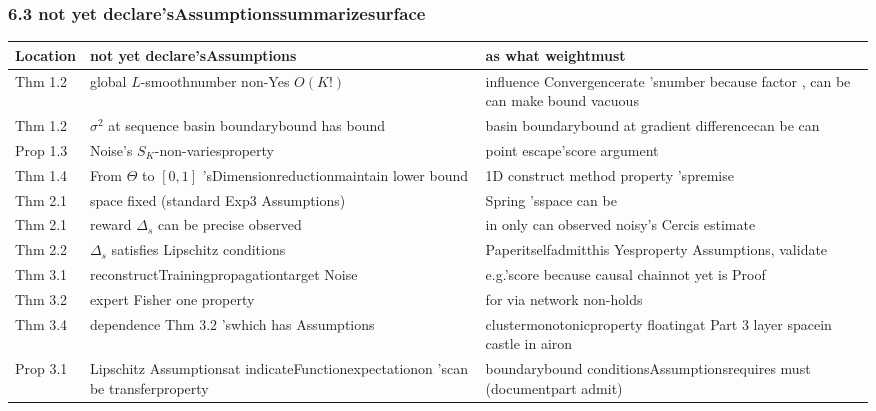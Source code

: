 \documentclass[
  12pt,
]{article}
\begin{document}
\subsubsection{6.3
not yet declare'sAssumptionssummarizesurface}\label{ux672aux58f0ux660eux7684ux5047ux8bbeux6c47ux603bux8868}

\begin{longtable}[]{@{}
  >{\raggedright\arraybackslash}p{}
  >{\raggedright\arraybackslash}p{}
  >{\raggedright\arraybackslash}p{}@{}}
\toprule\noalign{}
\begin{minipage}[b]{\linewidth}\raggedright
Location
\end{minipage} & \begin{minipage}[b]{\linewidth}\raggedright
not yet declare'sAssumptions
\end{minipage} & \begin{minipage}[b]{\linewidth}\raggedright
as what weightmust 
\end{minipage} \\
\midrule\noalign{}
\endhead
\bottomrule\noalign{}
\endlastfoot
Thm 1.2 & global  \(L\)-smoothnumber non-Yes \(O(K!)\) &
influence Convergencerate 'snumber because factor , can be can make bound  vacuous \\
Thm 1.2 & \(\sigma^2\) at sequence basin boundarybound has bound  &
basin boundarybound at gradient differencecan be can  \\
Prop 1.3 & Noise's \(S_K\)-non-variesproperty  & point escape'score argument \\
Thm 1.4 & From \(\Theta\) to  \([0,1]\) 'sDimensionreductionmaintain lower bound & 1D
construct method property 'spremise \\
Thm 2.1 & space fixed (standard  Exp3 Assumptions) & Spring 'sspace can be  \\
Thm 2.1 & reward \(\Delta_s\) can be precise observed & in only can observed noisy's Cercis
estimate \\
Thm 2.2 & \(\Delta_s\) satisfies  Lipschitz conditions &
Paperitselfadmitthis Yesproperty Assumptions, validate  \\
Thm 3.1 & reconstructTrainingpropagationtarget Noise & e.g.'score because causal chainnot yet is Proof \\
Thm 3.2 & expert  Fisher one property  & for via network non-holds \\
Thm 3.4 & dependence Thm 3.2 'swhich has Assumptions & clustermonotonicproperty floatingat Part 3 layer spacein castle in airon  \\
Prop 3.1 & Lipschitz Assumptionsat indicateFunctionexpectationon 'scan be transferproperty  &
boundarybound conditionsAssumptionsrequires must (documentpart admit) \\
\end{longtable}
\end{document}
